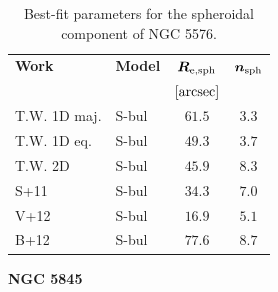 \documentclass[preprint2]{emulateapj}
\begin{document}
  \begin{table}[h]
  \small
  \caption{Best-fit parameters for the spheroidal component of NGC 5576.}
  \begin{center}
  \begin{tabular}{llcc}
  \hline
  {\bf Work} & {\bf Model}   & $\bm R_{\rm e,sph}$    & $\bm n_{\rm sph}$ \\
    &  &  $[\rm arcsec]$ & \\
  \hline
  T.W. 1D maj. & S-bul  & $61.5$  &  $3.3$ \\
  T.W. 1D eq.  & S-bul  & $49.3$  &  $3.7$ \\
  T.W. 2D      & S-bul  & $45.9$  &  $8.3$ \\
  \hline
  S+11      & S-bul & $34.3$  &  $7.0$ \\
  V+12      & S-bul & $16.9$  &  $5.1$ \\
  B+12      & S-bul & $77.6$  &  $8.7$ \\
  \hline
  \end{tabular}
  \end{center}
  \label{tab:n5845}
  \end{table}

  \clearpage\newpage\noindent
  {\bf NGC 5845 \\}
\end{document}
